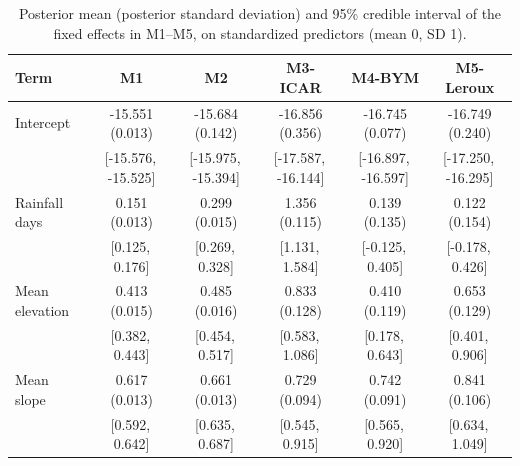 \begin{table}[h]
\caption{Posterior mean (posterior standard deviation) and 95\% credible interval of the fixed effects in M1--M5, on standardized predictors (mean 0, SD 1).}\label{tabA3}
\footnotesize
\begin{tabular}{@{}lccccc@{}}
\toprule
Term & M1 & M2 & M3-ICAR & M4-BYM & M5-Leroux \\
\midrule
Intercept & -15.551 (0.013) & -15.684 (0.142) & -16.856 (0.356) & -16.745 (0.077) & -16.749 (0.240) \\
 & [-15.576,\, -15.525] & [-15.975,\, -15.394] & [-17.587,\, -16.144] & [-16.897,\, -16.597] & [-17.250,\, -16.295] \\
Rainfall days & 0.151 (0.013) & 0.299 (0.015) & 1.356 (0.115) & 0.139 (0.135) & 0.122 (0.154) \\
 & [0.125,\, 0.176] & [0.269,\, 0.328] & [1.131,\, 1.584] & [-0.125,\, 0.405] & [-0.178,\, 0.426] \\
Mean elevation & 0.413 (0.015) & 0.485 (0.016) & 0.833 (0.128) & 0.410 (0.119) & 0.653 (0.129) \\
 & [0.382,\, 0.443] & [0.454,\, 0.517] & [0.583,\, 1.086] & [0.178,\, 0.643] & [0.401,\, 0.906] \\
Mean slope & 0.617 (0.013) & 0.661 (0.013) & 0.729 (0.094) & 0.742 (0.091) & 0.841 (0.106) \\
 & [0.592,\, 0.642] & [0.635,\, 0.687] & [0.545,\, 0.915] & [0.565,\, 0.920] & [0.634,\, 1.049] \\
\bottomrule
\end{tabular}
\end{table}
